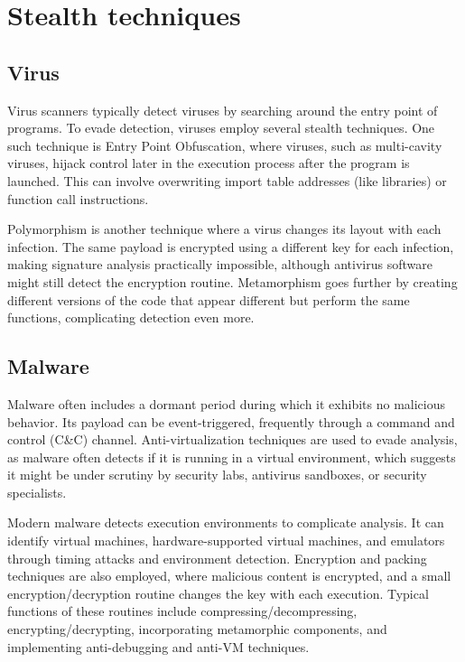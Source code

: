 \section{Stealth techniques}

\subsection{Virus}
Virus scanners typically detect viruses by searching around the entry point of programs. 
To evade detection, viruses employ several stealth techniques. 
One such technique is Entry Point Obfuscation, where viruses, such as multi-cavity viruses, hijack control later in the execution process after the program is launched. 
This can involve overwriting import table addresses (like libraries) or function call instructions.

Polymorphism is another technique where a virus changes its layout with each infection. 
The same payload is encrypted using a different key for each infection, making signature analysis practically impossible, although antivirus software might still detect the encryption routine. 
Metamorphism goes further by creating different versions of the code that appear different but perform the same functions, complicating detection even more.

\subsection{Malware}
Malware often includes a dormant period during which it exhibits no malicious behavior. 
Its payload can be event-triggered, frequently through a command and control (C\&C) channel. 
Anti-virtualization techniques are used to evade analysis, as malware often detects if it is running in a virtual environment, which suggests it might be under scrutiny by security labs, antivirus sandboxes, or security specialists.

Modern malware detects execution environments to complicate analysis. 
It can identify virtual machines, hardware-supported virtual machines, and emulators through timing attacks and environment detection. 
Encryption and packing techniques are also employed, where malicious content is encrypted, and a small encryption/decryption routine changes the key with each execution. 
Typical functions of these routines include compressing/decompressing, encrypting/decrypting, incorporating metamorphic components, and implementing anti-debugging and anti-VM techniques.

